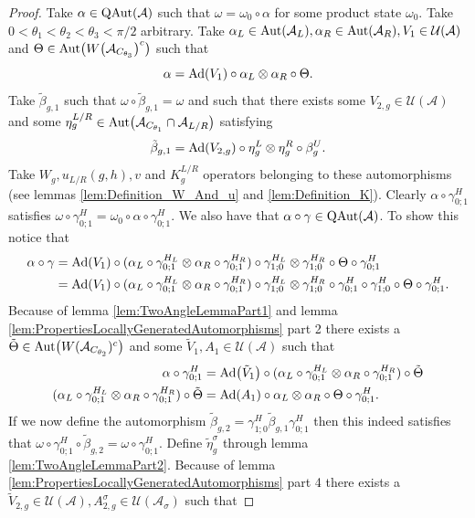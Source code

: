 \documentclass[12pt,a4paper,twoside]{article}
\let\originalleft\left
\let\originalright\right
\renewcommand{\left}{\mathopen{}\mathclose\bgroup\originalleft}
\renewcommand{\right}{\aftergroup\egroup\originalright}
\newcommand{\UU}{\mathcal U}
\renewcommand{\AA}{\mathcal A}
\newcommand{\Ad}[1]{\textrm{Ad}\left(#1\right)}
\newcommand{\Aut}[1]{\textrm{Aut}\left(#1\right)}
\newcommand{\QAut}[1]{\textrm{QAut}\left(#1\right)}
\theoremstyle{definition}
\numberwithin{equation}{section}
\begin{document}
\begin{proof}
	Take $\alpha\in\QAut{\AA}$ such that $\omega=\omega_0\circ\alpha$ for some product state $\omega_0$. Take $0<\theta_1<\theta_2<\theta_3<\pi/2$ arbitrary. Take $\alpha_L\in\Aut{\AA_L},\alpha_R\in\Aut{\AA_R},V_1\in\UU(\AA)$ and $\Theta\in\Aut{W\left(\AA_{C_{\theta_3}}\right)^c}$ such that
	\begin{equation}
		\alpha=\Ad{V_1}\circ\alpha_L\otimes\alpha_R\circ\Theta.
	\end{equation}
	Take $\tilde{\beta}_{g,1}$ such that $\omega\circ\tilde{\beta}_{g,1}=\omega$ and such that there exists some $V_{2,g}\in\UU(\AA)$ and some $\eta_g^{L/R}\in\Aut{\AA_{C_{\theta_1}}\cap\AA_{L/R}}$ satisfying
	\begin{equation}
		\tilde{\beta}_{g,1}=\Ad{V_{2,g}}\circ\eta_{g}^L\otimes\eta_{g}^R\circ\beta_g^U.
	\end{equation}
	Take $W_g,u_{L/R}(g,h),v$ and $K_g^{L/R}$ operators belonging to these automorphisms (see lemmas \ref{lem:Definition_W_And_u} and \ref{lem:Definition_K}). Clearly $\alpha\circ\gamma^H_{0;1}$ satisfies $\omega\circ\gamma^{H}_{0;1}=\omega_0\circ\alpha\circ\gamma^{H}_{0;1}$. We also have that $\alpha\circ\gamma\in\QAut{\AA}$. To show this notice that
	\begin{align}
		\alpha\circ\gamma&=\Ad{V_1}\circ(\alpha_L\circ\gamma^{H_L}_{0;1}\otimes\alpha_R\circ\gamma^{H_R}_{0;1})\circ\gamma^{H_L}_{1;0}\otimes\gamma^{H_R}_{1;0}\circ\Theta\circ\gamma^H_{0;1}\\
		&=\Ad{V_1}\circ(\alpha_L\circ\gamma^{H_L}_{0;1}\otimes\alpha_R\circ\gamma^{H_R}_{0;1})\circ\gamma^{H_L}_{1;0}\otimes\gamma^{H_R}_{1;0}\circ\gamma^{H}_{0;1}\circ\gamma^{H}_{1;0}\circ\Theta\circ\gamma^H_{0;1}.
	\end{align}
	Because of lemma \ref{lem:TwoAngleLemmaPart1} and lemma \ref{lem:PropertiesLocallyGeneratedAutomorphisms} part 2 there exists a $\tilde{\Theta}\in\Aut{W(\AA_{C_{\theta_2}})^c}$ and some $\tilde V_1,A_1\in\UU(\AA)$ such that
	\begin{align}
		\alpha\circ\gamma^H_{0;1}&=\Ad{\tilde V_1}\circ(\alpha_L\circ\gamma^{H_L}_{0;1}\otimes\alpha_R\circ\gamma^{H_R}_{0;1})\circ\tilde\Theta\\
		(\alpha_L\circ\gamma^{H_L}_{0;1}\otimes\alpha_R\circ\gamma^{H_R}_{0;1})\circ\tilde\Theta&=\Ad{A_1}\circ \alpha_L\otimes\alpha_R\circ\Theta\circ\gamma^{H}_{0;1}.
	\end{align}
	If we now define the automorphism $\tilde{\beta}_{g,2}=\gamma^{H}_{1;0}\tilde\beta_{g,1}\gamma^{H}_{0;1}$ then this indeed satisfies that $\omega\circ\gamma^{H}_{0;1}\circ\tilde{\beta}_{g,2}=\omega\circ\gamma^{H}_{0;1}$. Define $\tilde\eta_g^\sigma$ through lemma \ref{lem:TwoAngleLemmaPart2}. Because of lemma \ref{lem:PropertiesLocallyGeneratedAutomorphisms} part 4 there exists a $\tilde V_{2,g}\in\UU(\AA),A_{2,g}^{\sigma}\in\UU(\AA_\sigma)$ such that

\end{proof}
\end{document}
